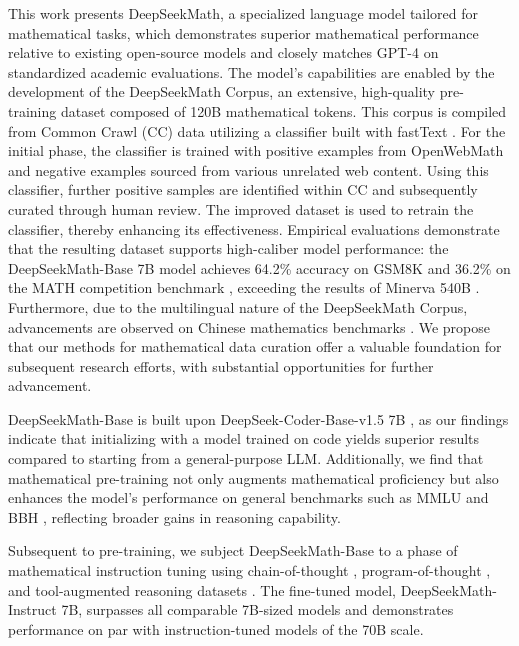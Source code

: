 This work presents DeepSeekMath, a specialized language model tailored for mathematical tasks, which demonstrates superior mathematical performance relative to existing open-source models and closely matches GPT-4 on standardized academic evaluations. The model's capabilities are enabled by the development of the DeepSeekMath Corpus, an extensive, high-quality pre-training dataset composed of 120B mathematical tokens. This corpus is compiled from Common Crawl (CC) data utilizing a classifier built with fastText \citep{joulin2016fasttext}. For the initial phase, the classifier is trained with positive examples from OpenWebMath \citep{openwebmath} and negative examples sourced from various unrelated web content. Using this classifier, further positive samples are identified within CC and subsequently curated through human review. The improved dataset is used to retrain the classifier, thereby enhancing its effectiveness. Empirical evaluations demonstrate that the resulting dataset supports high-caliber model performance: the DeepSeekMath-Base 7B model achieves 64.2\% accuracy on GSM8K \citep{gsm8k} and 36.2\% on the MATH competition benchmark \citep{MATH}, exceeding the results of Minerva 540B \citep{minerva}. Furthermore, due to the multilingual nature of the DeepSeekMath Corpus, advancements are observed on Chinese mathematics benchmarks \citep{wei2023cmath,agieval}. We propose that our methods for mathematical data curation offer a valuable foundation for subsequent research efforts, with substantial opportunities for further advancement.

DeepSeekMath-Base is built upon DeepSeek-Coder-Base-v1.5 7B \citep{deepseek-coder}, as our findings indicate that initializing with a model trained on code yields superior results compared to starting from a general-purpose LLM. Additionally, we find that mathematical pre-training not only augments mathematical proficiency but also enhances the model’s performance on general benchmarks such as MMLU \citep{mmlu} and BBH \citep{bbh}, reflecting broader gains in reasoning capability.

Subsequent to pre-training, we subject DeepSeekMath-Base to a phase of mathematical instruction tuning using chain-of-thought \citep{cot}, program-of-thought \citep{pot,pal}, and tool-augmented reasoning datasets \citep{tora}. The fine-tuned model, DeepSeekMath-Instruct 7B, surpasses all comparable 7B-sized models and demonstrates performance on par with instruction-tuned models of the 70B scale.


